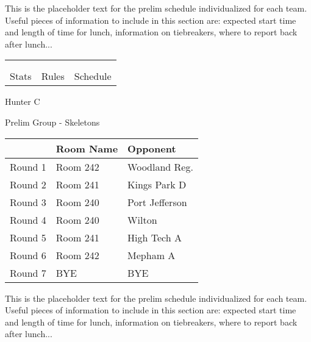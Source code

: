 \documentclass{article}%
\begin{document}
\vspace*{30pt}%
\linebreak%
This is the placeholder text for the prelim schedule individualized for each team. Useful pieces of information to include in this section are: expected start time and length of time for lunch, information on tiebreakers, where to report back after lunch...%
\vspace*{30pt}%
\newline%
%
\begin{tabularx}{\textwidth}{YYY}%
  &  &  \\%
\\%
Stats&Rules&Schedule\\%
\end{tabularx}%
\newpage%
%
\begin{center}%
\begin{Huge}%
Hunter C%
\end{Huge}%
\vspace*{12pt}%
\linebreak%
\begin{Large}%
Prelim Group {-} Skeletons%
\end{Large}%
\end{center}%
\vspace*{4pt}%
\begin{tabularx}{\textwidth}{|c|Y|Y|}%
\hline%
&Room Name&Opponent\\%
\hline%
Round 1&Room 242&Woodland Reg.\\%
Round 2&Room 241&Kings Park D\\%
Round 3&Room 240&Port Jefferson\\%
Round 4&Room 240&Wilton\\%
Round 5&Room 241&High Tech A\\%
Round 6&Room 242&Mepham A\\%
Round 7&BYE&BYE\\%
\hline%
\end{tabularx}%
\vspace*{30pt}%
\linebreak%
This is the placeholder text for the prelim schedule individualized for each team. Useful pieces of information to include in this section are: expected start time and length of time for lunch, information on tiebreakers, where to report back after lunch...%
\end{document}
